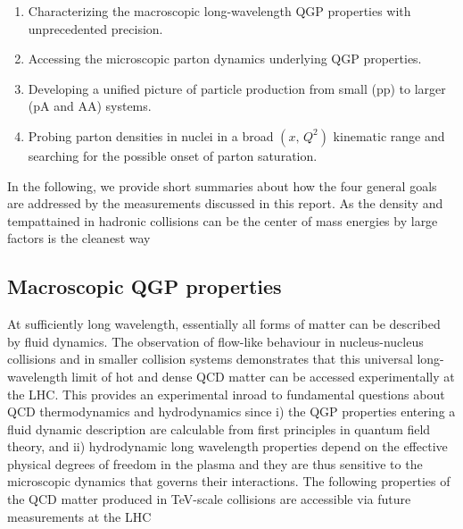 \documentclass[../report.tex]{subfiles}
\begin{document}
\begin{enumerate}
\item Characterizing the macroscopic long-wavelength QGP properties with unprecedented precision. 
\item Accessing the microscopic parton dynamics underlying QGP properties.
\item Developing a unified picture of particle production from small (pp) to larger (pA and AA) systems.
\item Probing parton densities in nuclei in a broad $(x,\,Q^2)$ kinematic range and searching for the possible onset of parton saturation.
\end{enumerate}
 
In the following, we provide short summaries about how the four general goals are addressed by the measurements discussed in this report. As the density and tempattained in hadronic collisions can be  the center of mass energies by large factors is the cleanest way  

\subsection{Macroscopic QGP properties}
At sufficiently long wavelength, essentially all forms of matter can be described by fluid dynamics. The observation of flow-like behaviour in nucleus-nucleus collisions and in smaller collision systems demonstrates that this universal long-wavelength limit of hot and dense QCD matter can be accessed experimentally at the LHC. This provides an experimental inroad to fundamental questions about QCD thermodynamics and hydrodynamics since i) the QGP properties entering a fluid dynamic description are calculable from first principles in quantum field theory, and ii) hydrodynamic long wavelength properties depend on the effective physical degrees of freedom in the plasma and they are thus sensitive to the microscopic dynamics that governs their interactions. The following properties of the QCD matter produced in TeV-scale collisions
are accessible via future measurements at the LHC
\end{document}
